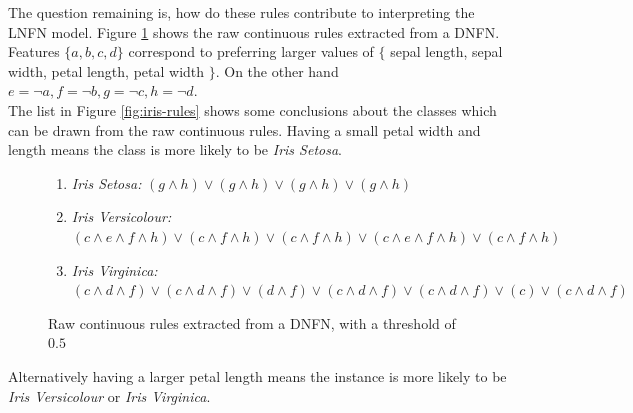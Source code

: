 \noindent
\begin{minipage}[t]{0.5\textwidth}
\vspace{0px}
The question remaining is, how do these rules contribute to interpreting the LNFN model. Figure \ref{fig:raw-iris-rules} shows the raw continuous rules extracted from a DNFN. Features $\{a,b,c,d\}$ correspond to preferring larger values of $\{$ sepal length, sepal width, petal length, petal width $\}$. On the other hand $e = \lnot a, f = \lnot b, g = \lnot c, h = \lnot d$.\\

The list in Figure \ref{fig:iris-rules} shows some conclusions about the classes which can be drawn from the raw continuous rules. Having a small petal width and length means the class is more likely to be \textit{Iris Setosa}. \\
\end{minipage}
\hspace{0.05\textwidth}
\begin{minipage}[t]{0.45\textwidth}
\vspace{0px}
\begin{figure}[H]
\begin{enumerate}
\item \textit{Iris Setosa:} $(g \land h) \lor (g \land h) \lor (g \land h) \lor (g \land h)$
\item \textit{Iris Versicolour:} $(c \land e \land f \land h) \lor (c \land f \land h) \lor (c \land f \land h) \lor (c \land e \land f \land h) \lor (c \land f \land h)$
\item \textit{Iris Virginica:} $(c \land d \land f) \lor (c \land d \land f) \lor (d \land f) \lor (c \land d \land f) \lor (c \land d \land f) \lor (c) \lor (c \land d \land f)$
\end{enumerate}
\caption{Raw continuous rules extracted from a DNFN, with a threshold of $0.5$}
\label{fig:raw-iris-rules}
\end{figure}
\end{minipage}

Alternatively having a larger petal length means the instance is more likely to be \textit{Iris Versicolour} or \textit{Iris Virginica}.

